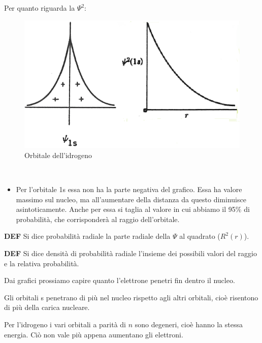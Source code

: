Per quanto riguarda la $\Psi^2$:
\begin{figure}[htp]
  \centering
  \includegraphics[width=16cm]{immagini/orbitale psi quadro idrogeno.png}
  \caption{Orbitale dell'idrogeno}
\end{figure}\\
\begin{itemize}
  \item Per l'orbitale 1s essa non ha la parte negativa del grafico. Essa ha valore massimo sul nucleo, ma all'aumentare della distanza da questo diminuisce asintoticamente. Anche per essa si taglia al valore in cui abbiamo il 95\% di probabilità, che corrisponderà al raggio dell'orbitale.
\end{itemize}
\textbf{DEF} Si dice probabilità radiale la parte radiale della $\Psi$ al quadrato ($R^2(r)$).

\textbf{DEF} Si dice densità di probabilità radiale l'insieme dei possibili valori del raggio e la relativa probabilità.

Dai grafici prossiamo capire quanto l'elettrone penetri fin dentro il nucleo.

Gli orbitali s penetrano di più nel nucleo rispetto agli altri orbitali, cioè risentono di più della carica nucleare.

Per l'idrogeno i vari orbitali a parità di $n$ sono degeneri, cioè hanno la stessa energia. Ciò non vale più appena aumentano gli elettroni.


